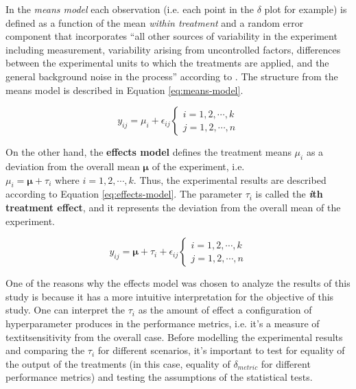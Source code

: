 In the \textit{means model} each observation (i.e. each point in the $\delta$ plot for example) is defined as a function of the mean \textit{within treatment} and a random error component that incorporates ``all other sources of variability in the experiment including measurement, variability arising from uncontrolled factors, differences between the experimental units to which the treatments are applied, and the general background noise in the process'' according to \cite{montgomery2017design}. The structure from the means model is described in Equation \ref{eq:means-model}.

\begin{equation}\label{eq:means-model}
    y_{ij} = \mu_i + \epsilon_{ij}
    \begin{cases}
        i = 1, 2, \cdots , k\\
        j = 1, 2, \cdots, n
    \end{cases}
\end{equation}

On the other hand, the \textbf{effects model} defines the treatment means $\mu_i$ as a deviation from the overall mean $\bm{\mu}$ of the experiment, i.e. $\mu_i = \bm{\mu}+ \tau_i \text{ where } i = 1, 2, \cdots, k$. Thus, the experimental results are described according to Equation \ref{eq:effects-model}. The parameter $\tau_i$ is called the \textbf{\textit{i}th treatment effect}, and it represents the deviation from the overall mean of the experiment.

\begin{equation}\label{eq:effects-model}
    y_{ij} = \bm{\mu} + \tau_i + \epsilon_{ij}
    \begin{cases}
        i = 1, 2, \cdots , k\\
        j = 1, 2, \cdots, n
    \end{cases}
\end{equation}

One of the reasons why the effects model was chosen to analyze the results of this study is because it has a more intuitive interpretation for the objective of this study. One can interpret the $\tau_i$ as the amount of effect a configuration of hyperparameter produces in the performance metrics, i.e. it's a measure of textit{sensitivity} from the overall case. Before modelling the experimental results and comparing the $\tau_i$ for different scenarios, it's important to test for equality of the output of the treatments (in this case, equality of $\delta_{metric}$ for different performance metrics) and testing the assumptions of the statistical tests.

